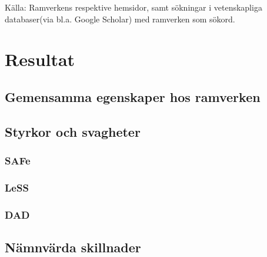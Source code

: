 	Källa: Ramverkens respektive hemsidor\cite{dad_web, less_web, safe_web}, samt sökningar i vetenskapliga databaser(via bl.a. Google Scholar) med ramverken som sökord.
	
	
	
\newpage
\section{Resultat}
	
	
	
	
	\subsection{Gemensamma egenskaper hos ramverken}
	
	
	
	\subsection{Styrkor och svagheter}
	
	\subsubsection{SAFe}
	
	
	
	\subsubsection{LeSS}
	
	\subsubsection{DAD}
	
	\subsection{Nämnvärda skillnader}

